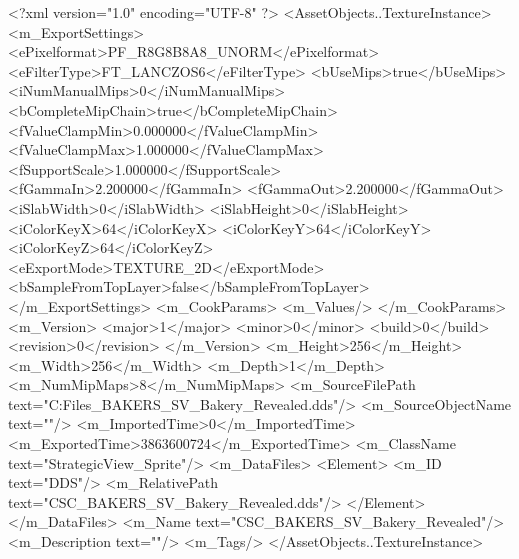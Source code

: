 <?xml version="1.0" encoding="UTF-8" ?>
<AssetObjects..TextureInstance>
	<m_ExportSettings>
		<ePixelformat>PF_R8G8B8A8_UNORM</ePixelformat>
		<eFilterType>FT_LANCZOS6</eFilterType>
		<bUseMips>true</bUseMips>
		<iNumManualMips>0</iNumManualMips>
		<bCompleteMipChain>true</bCompleteMipChain>
		<fValueClampMin>0.000000</fValueClampMin>
		<fValueClampMax>1.000000</fValueClampMax>
		<fSupportScale>1.000000</fSupportScale>
		<fGammaIn>2.200000</fGammaIn>
		<fGammaOut>2.200000</fGammaOut>
		<iSlabWidth>0</iSlabWidth>
		<iSlabHeight>0</iSlabHeight>
		<iColorKeyX>64</iColorKeyX>
		<iColorKeyY>64</iColorKeyY>
		<iColorKeyZ>64</iColorKeyZ>
		<eExportMode>TEXTURE_2D</eExportMode>
		<bSampleFromTopLayer>false</bSampleFromTopLayer>
	</m_ExportSettings>
	<m_CookParams>
		<m_Values/>
	</m_CookParams>
	<m_Version>
		<major>1</major>
		<minor>0</minor>
		<build>0</build>
		<revision>0</revision>
	</m_Version>
	<m_Height>256</m_Height>
	<m_Width>256</m_Width>
	<m_Depth>1</m_Depth>
	<m_NumMipMaps>8</m_NumMipMaps>
	<m_SourceFilePath text="C:\Users\Shadow\Desktop\Working Files\Icons\StrategicView\CSC_BAKERS_SV_Bakery_Revealed.dds"/>
	<m_SourceObjectName text=""/>
	<m_ImportedTime>0</m_ImportedTime>
	<m_ExportedTime>3863600724</m_ExportedTime>
	<m_ClassName text="StrategicView_Sprite"/>
	<m_DataFiles>
		<Element>
			<m_ID text="DDS"/>
			<m_RelativePath text="CSC_BAKERS_SV_Bakery_Revealed.dds"/>
		</Element>
	</m_DataFiles>
	<m_Name text="CSC_BAKERS_SV_Bakery_Revealed"/>
	<m_Description text=""/>
	<m_Tags/>
</AssetObjects..TextureInstance>

